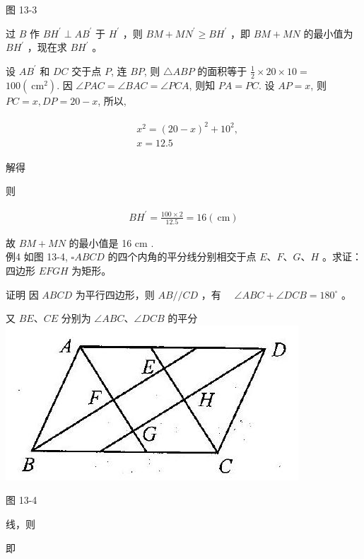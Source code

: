 \documentclass[10pt]{article}
\begin{document}
图 13-3

过 $B$ 作 $B H^{\prime} \perp A B^{\prime}$ 于 $H^{\prime}$ ，则 $B M+M N^{\prime} \geqslant B H^{\prime}$ ，即 $B M+M N$ 的最小值为 $B H^{\prime}$ ，现在求 $B H^{\prime}$ 。

设 $A B^{\prime}$ 和 $D C$ 交于点 $P$, 连 $B P$, 则 $\triangle A B P$ 的面积等于 $\frac{1}{2} \times 20 \times 10=$ $100\left(\mathrm{~cm}^{2}\right)$. 因 $\angle P A C=\angle B A C=\angle P C A$, 则知 $P A=P C$. 设 $A P=x$, 则 $P C=x, D P=20-x$, 所以,

\begin{align*}
\begin{aligned}
& x^{2}=(20-x)^{2}+10^{2}, \\
& x=12.5
\end{aligned}
\end{align*}

解得

则

\begin{align*}
B H^{\prime}=\frac{100 \times 2}{12.5}=16(\mathrm{~cm})
\end{align*}

故 $B M+M N$ 的最小值是 16 cm .\\
例4 如图 13-4, $\square A B C D$ 的四个内角的平分线分别相交于点 $E 、 F 、 G 、 H$ 。求证：四边形 $E F G H$ 为矩形。

证明 因 $A B C D$ 为平行四边形，则 $A B / / C D$ ，有 $\quad \angle A B C+\angle D C B=180^{\circ}$ 。

又 $B E 、 C E$ 分别为 $\angle A B C 、 \angle D C B$ 的平分\\
\includegraphics[max width=\textwidth, center]{2024_10_30_2c8f45efd4a519b08e1ag-121}

图 13-4

线，则

即
\end{document}
